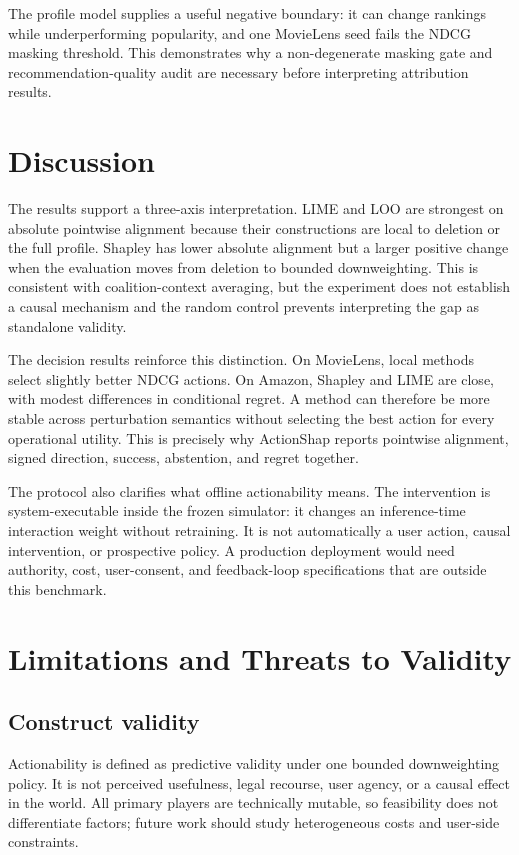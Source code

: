 \documentclass[pdflatex,sn-basic,Numbered]{sn-jnl}
\theoremstyle{thmstyleone}
\theoremstyle{thmstyletwo}
\theoremstyle{thmstylethree}
\begin{document}
The profile model supplies a useful negative boundary: it can change rankings while underperforming popularity, and one MovieLens seed fails the NDCG masking threshold. This demonstrates why a non-degenerate masking gate and recommendation-quality audit are necessary before interpreting attribution results.


\section{Discussion}
The results support a three-axis interpretation. LIME and LOO are strongest on absolute pointwise alignment because their constructions are local to deletion or the full profile. Shapley has lower absolute alignment but a larger positive change when the evaluation moves from deletion to bounded downweighting. This is consistent with coalition-context averaging, but the experiment does not establish a causal mechanism and the random control prevents interpreting the gap as standalone validity.

The decision results reinforce this distinction. On MovieLens, local methods select slightly better NDCG actions. On Amazon, Shapley and LIME are close, with modest differences in conditional regret. A method can therefore be more stable across perturbation semantics without selecting the best action for every operational utility. This is precisely why ActionShap reports pointwise alignment, signed direction, success, abstention, and regret together.

The protocol also clarifies what offline actionability means. The intervention is system-executable inside the frozen simulator: it changes an inference-time interaction weight without retraining. It is not automatically a user action, causal intervention, or prospective policy. A production deployment would need authority, cost, user-consent, and feedback-loop specifications that are outside this benchmark.

\section{Limitations and Threats to Validity}
\subsection{Construct validity}
Actionability is defined as predictive validity under one bounded downweighting policy. It is not perceived usefulness, legal recourse, user agency, or a causal effect in the world. All primary players are technically mutable, so feasibility does not differentiate factors; future work should study heterogeneous costs and user-side constraints.
\end{document}
